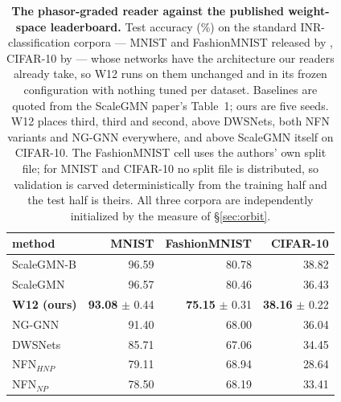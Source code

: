 \begin{table}[t]
\centering\small
\caption{\textbf{The phasor-graded reader against the published weight-space leaderboard.} Test accuracy (\%) on the standard INR-classification corpora --- MNIST and FashionMNIST released by \citet{navon2023dws}, CIFAR-10 by \citet{zhou2023nfn} --- whose networks have the architecture our readers already take, so W12 runs on them unchanged and in its frozen configuration with nothing tuned per dataset. Baselines are quoted from the ScaleGMN paper's Table~1; ours are five seeds. W12 places third, third and second, above DWSNets, both NFN variants and NG-GNN everywhere, and above ScaleGMN itself on CIFAR-10. The FashionMNIST cell uses the authors' own split file; for MNIST and CIFAR-10 no split file is distributed, so validation is carved deterministically from the training half and the test half is theirs. All three corpora are independently initialized by the measure of \S\ref{sec:orbit}.}
\label{tab:bench}
\begin{tabular}{@{}lrrr@{}}
\toprule
method & MNIST & FashionMNIST & CIFAR-10 \\
\midrule
ScaleGMN-B \citep{kalogeropoulos2024scalegmn} & 96.59 & 80.78 & 38.82 \\
ScaleGMN \citep{kalogeropoulos2024scalegmn} & 96.57 & 80.46 & 36.43 \\
\textbf{W12 (ours)} & \textbf{93.08} $\pm$ 0.44 & \textbf{75.15} $\pm$ 0.31 & \textbf{38.16} $\pm$ 0.22 \\
NG-GNN \citep{kofinas2024graph} & 91.40 & 68.00 & 36.04 \\
DWSNets \citep{navon2023dws} & 85.71 & 67.06 & 34.45 \\
NFN$_{HNP}$ \citep{zhou2023nfn} & 79.11 & 68.94 & 28.64 \\
NFN$_{NP}$ \citep{zhou2023nfn} & 78.50 & 68.19 & 33.41 \\
\bottomrule
\end{tabular}
\end{table}
